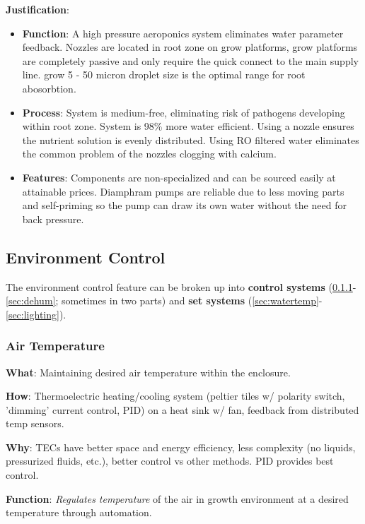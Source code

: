\documentclass{report}
\begin{document}
\textbf{Justification}: 
\begin{itemize}
    \item \textbf{Function}: A high pressure aeroponics system eliminates water parameter feedback. Nozzles are located in root zone on grow platforms, grow platforms are completely passive and only require the quick connect to the main supply line. grow 5 - 50 micron droplet size is the optimal range for root abosorbtion. 
    \item \textbf{Process}: System is medium-free, eliminating risk of pathogens developing within root zone. System is 98\% more water efficient. Using a nozzle ensures the nutrient solution is evenly distributed. Using RO filtered water eliminates the common problem of the nozzles clogging with calcium.
    \item \textbf{Features}: Components are non-specialized and can be sourced easily at attainable prices. Diamphram pumps are reliable due to less moving parts and self-priming so the pump can draw its own water without the need for back pressure. 
\end{itemize}

\newpage


\subsection{Environment Control}
\label{sec:environment}

The environment control feature can be broken up into \textbf{control systems} (\ref{sec:airtemp}-\ref{sec:dehum}; sometimes in two parts) and \textbf{set systems} (\ref{sec:watertemp}-\ref{sec:lighting}).

\subsubsection{Air Temperature}
\label{sec:airtemp}

\textbf{What}: Maintaining desired air temperature within the enclosure.

\textbf{How}: Thermoelectric heating/cooling system (peltier tiles w/ polarity switch, 'dimming' current control, PID) on a heat sink w/ fan, feedback from distributed temp sensors.

\textbf{Why}: TECs have better space and energy efficiency, less complexity (no liquids, pressurized fluids, etc.), better control vs other methods. PID provides best control.


\textbf{Function}: \textit{Regulates temperature} of the air in growth environment at a desired temperature through automation.
\end{document}
